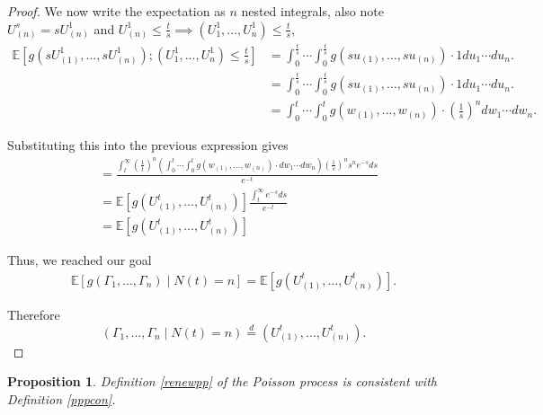 \documentclass[11pt, oneside]{article}   	%
\newtheorem{proposition}{Proposition}[section]
\theoremstyle{definition}
\theoremstyle{remark}
\begin{document}
\begin{proof}
We now write the expectation as $n$ nested integrals, also note $U_{(n)}^s = sU_{(n)}^1$ and $U_{(n)}^1 \leq \frac{t}{s} \implies (U_1^1,...,U_n^1) \leq \frac{t}{s}$,
\begin{align*}
\mathbb{E}\left[g(sU_{(1)}^1,\dots,sU_{(n)}^1);(U_1^1,...,U_n^1) \leq \frac{t}{s}\right] 
&= \int_0^\frac{t}{s}\cdots\int_0^\frac{t}{s} g(su_{(1)},\dots,su_{(n)}) \cdot 1 du_1\cdots du_n. \\
&= \int_0^\frac{t}{s}\cdots\int_0^\frac{t}{s} g(su_{(1)},\dots,su_{(n)}) \cdot 1 du_1\cdots du_n. \\
&= \int_0^t\cdots\int_0^t g(w_{(1)},\dots,w_{(n)}) \cdot \left(\frac{1}{s}\right)^n dw_1\cdots dw_n.
\end{align*}

Substituting this into the previous expression gives
\begin{align*}
&=\frac{\int_t^\infty \left(\frac{1}{t}\right)^n \left(\int_0^t\cdots\int_0^t g(w_{(1)},\dots,w_{(n)}) \cdot dw_1\cdots dw_n \right) \left(\frac{1}{s}\right)^n s^n e^{-s} ds}{e^{-t}} \\
&= \mathbb{E}\left[g(U_{(1)}^t,\dots,U_{(n)}^t)\right] \frac{\int_t^\infty e^{-s} ds}{e^{-t}} \\
&= \mathbb{E}\left[g(U_{(1)}^t,\dots,U_{(n)}^t)\right]
\end{align*}

Thus, we reached our goal
\begin{align*}
\mathbb{E}\left[g(\Gamma_1,\dots,\Gamma_n)\mid N(t)=n\right]= \mathbb{E}\left[g(U_{(1)}^t,\dots,U_{(n)}^t)\right].
\end{align*}

Therefore
$$(\Gamma_1,\dots,\Gamma_n \mid N(t)=n)\stackrel{d}{=}(U_{(1)}^t,\dots,U_{(n)}^t).$$
\end{proof}
\begin{proposition} \label{consistentpp1}
  Definition \ref{renewpp} of the Poisson process is consistent with Definition \ref{pppcon}.
\end{proposition}
\end{document}
